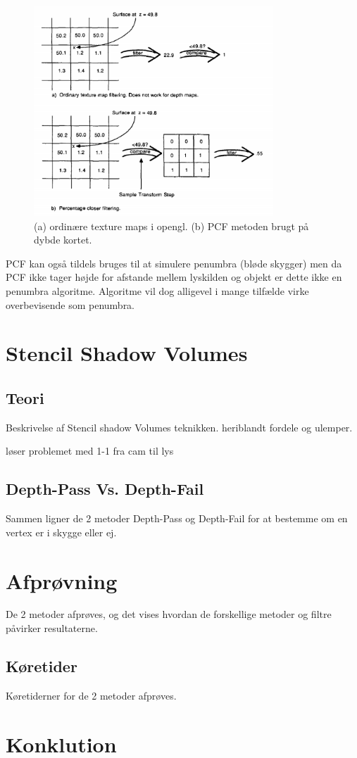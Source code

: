 \documentclass[11pt,a4paper]{article}
\begin{document}
\begin{figure}[ht!]
\centering
\includegraphics[width=90mm]{img/PCF1.png}
\caption{(a) ordinære texture maps i opengl. (b) PCF metoden brugt på dybde kortet.}
\label{P4}
\end{figure}


PCF kan også tildels bruges til at simulere penumbra (bløde skygger) men da PCF ikke tager højde for afstande mellem lyskilden og objekt er dette ikke en penumbra algoritme. Algoritme vil dog alligevel i mange tilfælde virke overbevisende som penumbra.


\section{Stencil Shadow Volumes}

\subsection{Teori}
Beskrivelse af Stencil shadow Volumes teknikken. heriblandt fordele og ulemper.

løser problemet med 1-1 fra cam til lys

\subsection{Depth-Pass Vs. Depth-Fail}
Sammen ligner de 2 metoder Depth-Pass og Depth-Fail for at bestemme om en vertex er i skygge eller ej.


\section{Afprøvning}
 De 2 metoder afprøves, og det vises hvordan de forskellige metoder og filtre påvirker resultaterne.	

\subsection{Køretider}
Køretiderner for de 2 metoder afprøves.

\section{Konklution}
\end{document}
